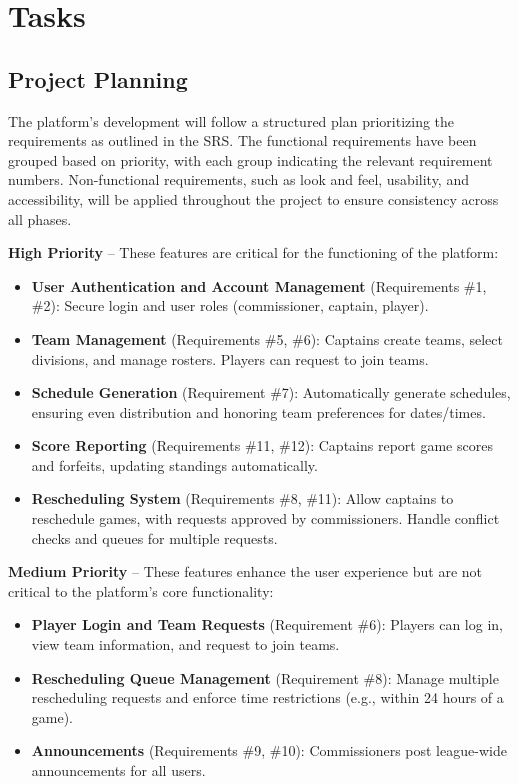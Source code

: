 \documentclass[12pt]{article}
\begin{document}
\section{Tasks}

\subsection{Project Planning}
The platform’s development will follow a structured plan prioritizing the requirements as outlined in the SRS. The functional requirements have been grouped based on priority, with each group indicating the relevant requirement numbers. Non-functional requirements, such as look and feel, usability, and accessibility, will be applied throughout the project to ensure consistency across all phases.

\textbf{High Priority} – These features are critical for the functioning of the platform:
\begin{itemize}
    \item \textbf{User Authentication and Account Management} (Requirements \#1, \#2): Secure login and user roles (commissioner, captain, player).
    \item \textbf{Team Management} (Requirements \#5, \#6): Captains create teams, select divisions, and manage rosters. Players can request to join teams.
    \item \textbf{Schedule Generation} (Requirement \#7): Automatically generate schedules, ensuring even distribution and honoring team preferences for dates/times.
    \item \textbf{Score Reporting} (Requirements \#11, \#12): Captains report game scores and forfeits, updating standings automatically.
    \item \textbf{Rescheduling System} (Requirements \#8, \#11): Allow captains to reschedule games, with requests approved by commissioners. Handle conflict checks and queues for multiple requests.
\end{itemize}

\textbf{Medium Priority} – These features enhance the user experience but are not critical to the platform’s core functionality:
\begin{itemize}
    \item \textbf{Player Login and Team Requests} (Requirement \#6): Players can log in, view team information, and request to join teams.
    \item \textbf{Rescheduling Queue Management} (Requirement \#8): Manage multiple rescheduling requests and enforce time restrictions (e.g., within 24 hours of a game).
    \item \textbf{Announcements} (Requirements \#9, \#10): Commissioners post league-wide announcements for all users.
\end{itemize}
\end{document}
